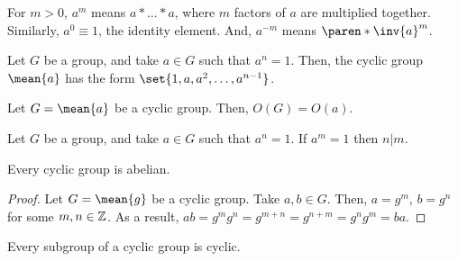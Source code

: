 \documentclass[11pt]{penrose}
\newcommand{\cyclic}[1]{\mean{#1}}
\begin{document}
\begin{notation}
    For $m > 0$, $a^m$ means $a * \dots * a$, where $m$ factors of $a$ are multiplied together. Similarly, $a^0 \equiv 1$, the identity element. And, $a^{-m}$ means $\paren*{\inv{a}}^m$.
\end{notation}

\begin{nthm}
    Let $G$ be a group, and take $a \in G$ such that $a^n = 1$. Then, the cyclic group $\cyclic{a}$ has the form $\set{1, a, a^2, \dots, a^{n-1}}$.
\end{nthm}

\begin{nthm}
    Let $G = \cyclic{a}$ be a cyclic group. Then, $O(G) = O(a)$.
\end{nthm}

\begin{nthm}
    Let $G$ be a group, and take $a \in G$ such that $a^n = 1$. If $a^m = 1$ then $n | m$.
\end{nthm}

\begin{nthm}
    Every cyclic group is abelian.
\end{nthm}
\begin{proof}
    Let $G = \cyclic{g}$ be a cyclic group. Take $a, b \in G$. Then, $a = g^m$, $b = g^n$ for some $m, n \in \mathbb{Z}$. As a result, $ab = g^m g^n = g^{m+n} = g^{n+m} = g^n g^m = ba$.
\end{proof}

\begin{nthm}
    Every subgroup of a cyclic group is cyclic.
\end{nthm}
\end{document}

